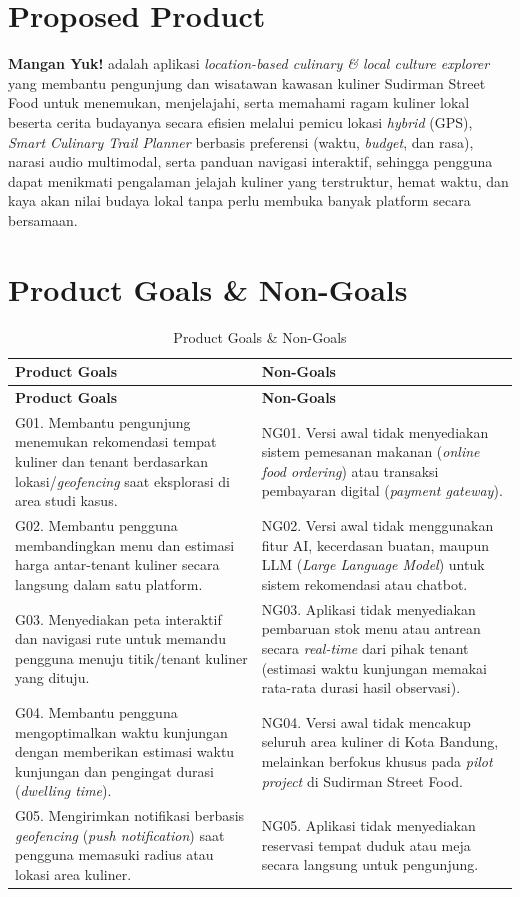 \section{Proposed Product}

\textbf{Mangan Yuk!} adalah aplikasi \textit{location-based culinary \& local culture explorer} yang membantu pengunjung dan wisatawan kawasan kuliner Sudirman Street Food untuk menemukan, menjelajahi, serta memahami ragam kuliner lokal beserta cerita budayanya secara efisien melalui pemicu lokasi \textit{hybrid} (GPS), \textit{Smart Culinary Trail Planner} berbasis preferensi (waktu, \textit{budget}, dan rasa), narasi audio multimodal, serta panduan navigasi interaktif, sehingga pengguna dapat menikmati pengalaman jelajah kuliner yang terstruktur, hemat waktu, dan kaya akan nilai budaya lokal tanpa perlu membuka banyak platform secara bersamaan.

\section{Product Goals \& Non-Goals}

\begin{longtable}{|L{0.500}|L{0.500}|}
\caption{Product Goals \& Non-Goals}\\
\hline
{}\textbf{Product Goals} & \textbf{Non-Goals} \\ \hline
\endfirsthead
\hline
{}\textbf{Product Goals} & \textbf{Non-Goals} \\ \hline
\endhead
G01. Membantu pengunjung menemukan rekomendasi tempat kuliner dan tenant berdasarkan lokasi/\textit{geofencing} saat eksplorasi di area studi kasus. & NG01. Versi awal tidak menyediakan sistem pemesanan makanan (\textit{online food ordering}) atau transaksi pembayaran digital (\textit{payment gateway}). \\ \hline
G02. Membantu pengguna membandingkan menu dan estimasi harga antar-tenant kuliner secara langsung dalam satu platform. & NG02. Versi awal tidak menggunakan fitur AI, kecerdasan buatan, maupun LLM (\textit{Large Language Model}) untuk sistem rekomendasi atau chatbot. \\ \hline
G03. Menyediakan peta interaktif dan navigasi rute untuk memandu pengguna menuju titik/tenant kuliner yang dituju. & NG03. Aplikasi tidak menyediakan pembaruan stok menu atau antrean secara \textit{real-time} dari pihak tenant (estimasi waktu kunjungan memakai rata-rata durasi hasil observasi). \\ \hline
G04. Membantu pengguna mengoptimalkan waktu kunjungan dengan memberikan estimasi waktu kunjungan dan pengingat durasi (\textit{dwelling time}). & NG04. Versi awal tidak mencakup seluruh area kuliner di Kota Bandung, melainkan berfokus khusus pada \textit{pilot project} di Sudirman Street Food. \\ \hline
G05. Mengirimkan notifikasi berbasis \textit{geofencing }(\textit{push notification}) saat pengguna memasuki radius atau lokasi area kuliner. & NG05. Aplikasi tidak menyediakan reservasi tempat duduk atau meja secara langsung untuk pengunjung. \\ \hline
\end{longtable}
